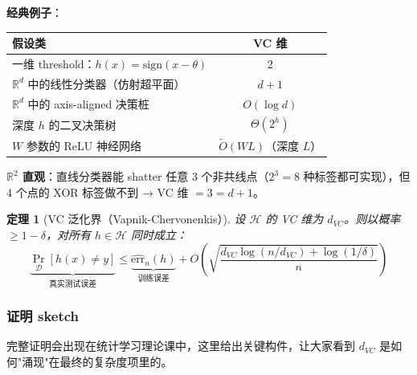 \documentclass[12pt, a4paper]{ctexart}
\newtheorem{theorem}{定理}[section]
\begin{document}
\textbf{经典例子}：
\begin{center}
\renewcommand{\arraystretch}{1.3}
\begin{tabular}{lc}
\toprule
\textbf{假设类} & \textbf{VC 维} \\ \midrule
一维 threshold：$h(x) = \text{sign}(x - \theta)$ & 2 \\
$\mathbb{R}^d$ 中的线性分类器（仿射超平面） & $d + 1$ \\
$\mathbb{R}^d$ 中的 axis-aligned 决策桩 & $O(\log d)$ \\
深度 $h$ 的二叉决策树 & $\Theta(2^h)$ \\
$W$ 参数的 ReLU 神经网络 & $\tilde{O}(W L)$（深度 $L$）\\
\bottomrule
\end{tabular}
\end{center}

\textbf{$\mathbb{R}^2$ 直观}：直线分类器能 shatter 任意 3 个非共线点（$2^3 = 8$ 种标签都可实现），但 4 个点的 XOR 标签做不到 → VC 维 $= 3 = d + 1$。

\begin{theorem}[VC 泛化界（Vapnik-Chervonenkis）]
设 $\mathcal{H}$ 的 VC 维为 $d_{VC}$。则以概率 $\geq 1 - \delta$，对所有 $h \in \mathcal{H}$ 同时成立：
\[
\underbrace{\Pr_{\mathcal{D}}[h(x) \neq y]}_{\text{真实测试误差}} \leq \underbrace{\widehat{\mathrm{err}}_n(h)}_{\text{训练误差}} + O\!\left(\sqrt{\frac{d_{VC}\log(n/d_{VC}) + \log(1/\delta)}{n}}\right)
\]
\end{theorem}

\subsubsection{证明 sketch}

完整证明会出现在统计学习理论课中，这里给出关键构件，让大家看到 $d_{VC}$ 是如何"涌现"在最终的复杂度项里的。
\end{document}
